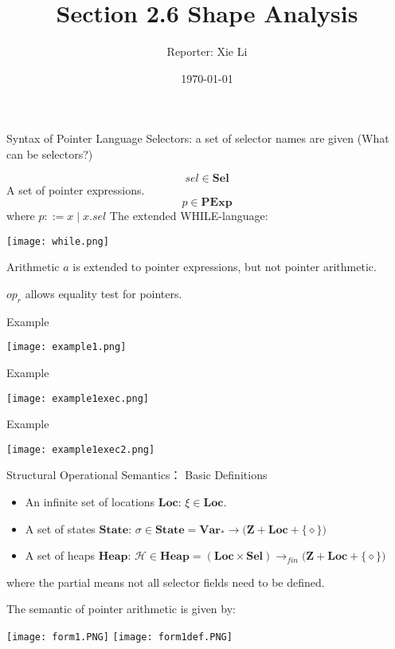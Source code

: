 \documentclass[aspectratio=1610, 13pt]{beamer}
\title{Section 2.6 Shape Analysis}
\author{Reporter:  Xie Li}
\date{\today}
\begin{document}
\maketitle
\begin{frame}{Syntax of Pointer Language}
    Selectors: a set of selector names are given (What can be selectors?)
    
    \[sel \in \mathbf{Sel}\]
    A set of pointer expressions.
    \[p \in \mathbf{PExp}\]
    where $p ::= x \mid x.sel$
    The extended WHILE-language:
    \begin{center}
        \texttt{[image: while.png]}
    \end{center}
    Arithmetic $a$ is extended to pointer expressions, but not pointer arithmetic.
    
    $op_r$ allows equality test for pointers.
    
    
\end{frame}

\begin{frame}{Example}
    
    \begin{center}
        \texttt{[image: example1.png]}
\end{center}
\end{frame}

\begin{frame}{Example}
    
    \begin{center}
    \texttt{[image: example1exec.png]}
\end{center}
\end{frame}

\begin{frame}{Example}
    \begin{center}
    \texttt{[image: example1exec2.png]}\end{center}
\end{frame}


\begin{frame}{Structural Operational Semantics： Basic Definitions}
    \begin{itemize}
        \item An infinite set of locations $\mathbf{Loc}$: $\xi \in \mathbf{Loc}$.
        \item A set of states $\mathbf{State}$: $\sigma \in \mathbf{State} = \mathbf{Var_*\rightarrow (Z + Loc +} \{\diamond\})$
        \item A set of heaps $\mathbf{Heap}$: $\mathcal{H} \in \mathbf{Heap} = (\mathbf{Loc}\times \mathbf{Sel}) \rightarrow_{fin} \mathbf{(Z + Loc +} \{\diamond\}) $
    \end{itemize}
    where the partial means not all selector fields need to be defined.
    
    The semantic of pointer arithmetic is given by:
        \begin{center}
        \texttt{[image: form1.PNG]}
        \texttt{[image: form1def.PNG]}
\end{center}
\end{frame}
\end{document}
